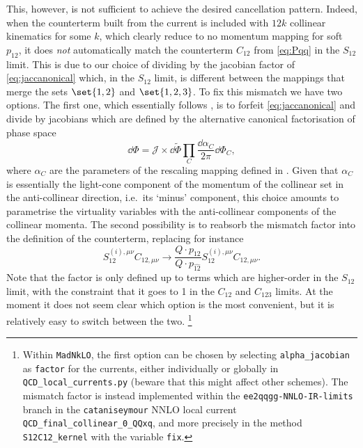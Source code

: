\documentclass[11pt,a4paper]{article}
\newcommand{\mpd}[1]{\widehat{#1}}
\begin{document}
This, however, is not sufficient to achieve
the desired cancellation pattern.
Indeed, when the counterterm built from the current 
is included with $12k$ collinear kinematics for some $k$,
which clearly reduce to no momentum mapping for soft $p_{12}$,
it does \emph{not} automatically match
the counterterm $C_{12}$ from \cref{eq:Pqq} in the $S_{12}$ limit.
This is due to our choice of dividing by the jacobian factor
of \cref{eq:jaccanonical} which, in the $S_{12}$ limit,
is different between the mappings that merge
the sets $\set{1,2}$ and $\set{1,2,3}$.
To fix this mismatch we have two options.
The first one, which essentially follows \cite{Somogyi:2006da},
is to forfeit \cref{eq:jaccanonical} and divide by jacobians
which are defined by the alternative
canonical factorisation of phase space
\begin{equation}
	\dd{\Phi} = \mathcal{J}\times \dd{\tilde{\Phi}}
	\prod_{C} \frac{\dd{\alpha_C}}{2\pi} \dd{\Phi_C},
\end{equation}
where $\alpha_C$ are the parameters of the rescaling mapping
defined in \cite{Somogyi:2006da}.
Given that $\alpha_C$ is essentially the light-cone component
of the momentum of the collinear set in the anti-collinear direction,
i.e.\ its `minus' component,
this choice amounts to parametrise the virtuality variables
with the anti-collinear components of the collinear momenta.
The second possibility is to reabsorb the mismatch factor
into the definition of the counterterm, replacing for instance
\begin{equation}
	S_{12}^{(i),\mu\nu} C_{12,\mu\nu}
	\to \frac{Q\cdot p_{12}}{Q\cdot p_{\mpd{12}}}
	S_{12}^{(i),\mu\nu} C_{12,\mu\nu}.
\end{equation}
Note that the factor is only defined up to terms
which are higher-order in the $S_{12}$ limit,
with the constraint that it goes to 1
in the $C_{12}$ and $C_{123}$ limits.
At the moment it does not seem clear which option
is the most convenient, but it is relatively easy
to switch between the two.%
\footnote{
Within \texttt{MadNkLO}, the first option can be chosen
by selecting \texttt{alpha\_jacobian} as \texttt{factor}
for the currents, either individually
or globally in \texttt{QCD\_local\_currents.py}
(beware that this might affect other schemes).
The mismatch factor is instead implemented
within the \texttt{ee2qqgg-NNLO-IR-limits} branch
in the \texttt{cataniseymour} NNLO local current
\texttt{QCD\_final\_collinear\_0\_QQxq},
and more precisely in the method \texttt{S12C12\_kernel}
with the variable \texttt{fix}.
}
\end{document}
